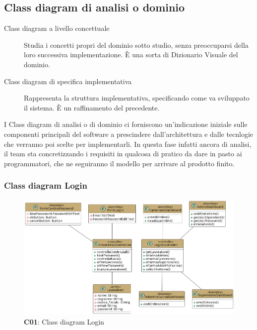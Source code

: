 \subsection{Class diagram di analisi o dominio}

    \begin{flushleft}
        \begin{description}
            \item[Class diagram a livello concettuale] Studia i concetti propri del dominio sotto studio, senza preoccuparsi della loro successiva implementazione. È una sorta di Dizionario Visuale del dominio.
            \item[Class diagram di specifica implementativa] Rappresenta la struttura implementativa, specificando come va sviluppato il sistema. È un raffinamento del precedente.
          \end{description}

        I Class diagram di analisi o di dominio ci forniscono un'indicazione iniziale sulle componenti principali del software a prescindere 
        dall'architettura e dalle tecnlogie che verranno poi scelte per implementarli. 
        In questa fase infatti ancora di analisi, il team sta concretizzando i requisiti in qualcosa di pratico da dare in pasto ai programmatori, che 
        ne seguiranno il modello per arrivare al prodotto finito.

    \end{flushleft}

    \subsubsection{Class diagram Login}
        \begin{figure}[H]
            \centering
            \includegraphics[scale=0.45]{assets/diagrammi/Class diagram di analisi/Gestione Login.png}
            \caption{\textbf{C01}: Class diagram Login}\label{fig:Login}
        \end{figure}

